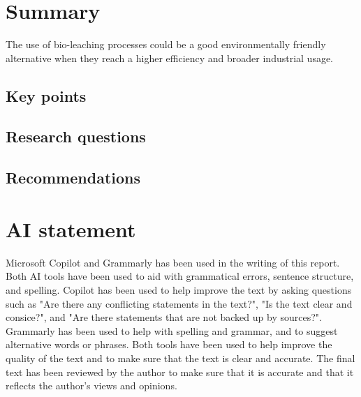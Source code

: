 \section{Summary}

The use of bio-leaching processes could be a good environmentally friendly alternative when they reach a higher efficiency and broader industrial usage.

\subsection{Key points}

\subsection{Research questions}

\subsection{Recommendations}

\section{AI statement}

Microsoft Copilot and Grammarly has been used in the writing of this report. Both AI tools have been used to aid with grammatical errors, sentence structure, and spelling. Copilot has been used to help improve the text by asking questions such as "Are there any conflicting statements in the text?", "Is the text clear and consice?", and "Are there statements that are not backed up by sources?". Grammarly has been used to help with spelling and grammar, and to suggest alternative words or phrases. Both tools have been used to help improve the quality of the text and to make sure that the text is clear and accurate. The final text has been reviewed by the author to make sure that it is accurate and that it reflects the author's views and opinions.

